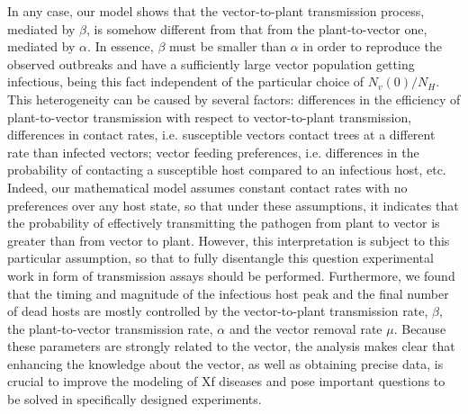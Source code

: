 In any case, our model shows that the vector-to-plant transmission process,
mediated by $\beta$, is somehow different from that from the plant-to-vector
one, mediated by $\alpha$. In essence, $\beta$ must be smaller than $\alpha$ in
order to reproduce the observed outbreaks and have a sufficiently large vector
population getting infectious, being this fact independent of the particular
choice of $N_v(0)/N_H$. This heterogeneity can be caused by several factors:
differences in the efficiency of plant-to-vector transmission with respect to
vector-to-plant transmission, differences in contact rates, i.e. susceptible
vectors contact trees at a different rate than infected vectors; vector feeding
preferences, i.e. differences in the probability of contacting a susceptible
host compared to an infectious host, etc. Indeed, our mathematical model
assumes constant contact rates with no preferences over any host state, so that
under these assumptions, it indicates that the probability of effectively
transmitting the pathogen from plant to vector is greater than from vector to
plant. However, this interpretation is subject to this particular assumption,
so that to fully disentangle this question experimental work in form of
transmission assays should be performed. Furthermore, we found that the timing
and magnitude of the infectious host peak and the final number of dead hosts
are mostly controlled by the vector-to-plant transmission rate, $\beta$, the
plant-to-vector transmission rate, $\alpha$ and the vector removal rate $\mu$.
Because these parameters are strongly related to the vector, the analysis makes
clear that enhancing the knowledge about the vector, as well as obtaining
precise data, is crucial to improve the modeling of Xf diseases and pose
important questions to be solved in specifically designed experiments.

